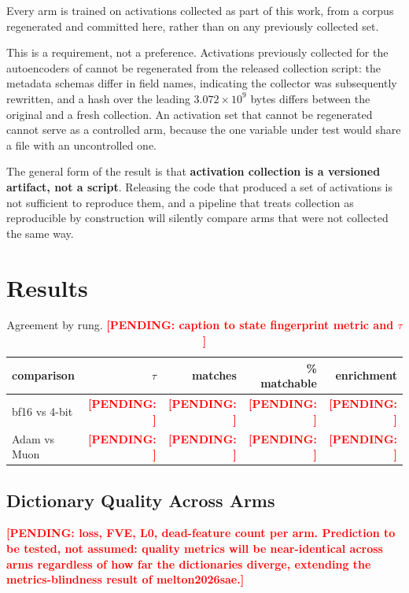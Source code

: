\documentclass[11pt,a4paper]{article}
\newcounter{pendingcount}
\DeclareRobustCommand{\pending}[1]{\stepcounter{pendingcount}%
  \textcolor{red}{\textbf{[PENDING: #1]}}}
\begin{document}
Every arm is trained on activations collected as part of this work, from a corpus
regenerated and committed here, rather than on any previously collected set.

This is a requirement, not a preference. Activations previously collected for the
autoencoders of \citet{melton2026sae} cannot be regenerated from the released
collection script: the metadata schemas differ in field names, indicating the collector
was subsequently rewritten, and a hash over the leading $3.072 \times 10^{9}$ bytes
differs between the original and a fresh collection. An activation set that cannot be
regenerated cannot serve as a controlled arm, because the one variable under test would
share a file with an uncontrolled one.

The general form of the result is that \textbf{activation collection is a versioned
artifact, not a script}. Releasing the code that produced a set of activations is not
sufficient to reproduce them, and a pipeline that treats collection as reproducible by
construction will silently compare arms that were not collected the same way.

\section{Results}
\label{sec:results}

\begin{table}[H]
  \centering
  \caption{Agreement by rung. \pending{caption to state fingerprint metric and $\tau$}}
  \label{tab:results}
  \smallskip
  \begin{tabular}{lrrrr}
    \toprule
    comparison & $\tau$ & matches & \% matchable & enrichment \\
    \midrule
    bf16 vs 4-bit  & \pending{} & \pending{} & \pending{} & \pending{} \\
    Adam vs Muon   & \pending{} & \pending{} & \pending{} & \pending{} \\
    \bottomrule
  \end{tabular}
\end{table}

\subsection{Dictionary Quality Across Arms}

\pending{loss, FVE, L0, dead-feature count per arm. Prediction to be tested, not
assumed: quality metrics will be near-identical across arms regardless of how far the
dictionaries diverge, extending the metrics-blindness result of melton2026sae.}
\end{document}
